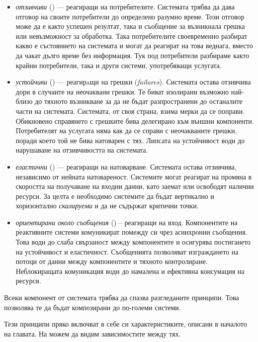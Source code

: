 \begin{itemize}
  \item \emph{отзивчиви} () — реагиращи на потребителите. Системата трябва да дава отговор на своите потребители до определено разумно време. Този отговор може да е както успешен резултат, така и съобщение за възникнала грешка или невъзможност за обработка. Така потребителите своевременно разбират какво е състоянието на системата и могат да реагират на това веднага, вместо да чакат дълго време без информация. Тук под потребители разбираме както крайни потребители, така и други системи, употребяващи услугата.
  
  \item \emph{устойчиви} () — реагирaщи на грешки (\emph{failures}). Системата остава отзивчива дори в случаите на неочаквани грешки. Те биват изолирани възможно най-близо до тяхното възникване за да не бъдат разпространени до останалите части на системата. Системата, от своя страна, взима мерки да се поправи. Обикновено справянето с грешките бива делегирано към външни компоненти. Потребителят на услугата няма как да се справи с неочакваните грешки, поради което той не бива натоварен с тях. Липсата на устойчивост води до нарушаване на отзивчивостта на системата.
  
  \item \emph{еластични} () — реагиращи на натоварване. Системата остава отзивчива, независимо от нейната натовареност. Системите могат реагират на промяна в скоростта на получаване на входни данни, като заемат или освободят налични ресурси. За целта е необходимо системите да бъдат вертикално и хоризонтално \emph{скалируеми} и да не съдържат критични точки.
  
  \item \emph{ориентирани около съобщения} () – реагиращи на вход. Компонентите на реактивните системи комуникират помежду си чрез асинхронни съобщения. Това води до слаба свързаност между компонентите и осигурява постигането на устойчивост и еластичност. Съобщенията позволяват изграждането на потоци от данни между компонентите и тяхното контролиране. Неблокиращата комуникация води до намалена и ефективна консумация на ресурси.
\end{itemize}

Всеки компонент от системата трябва да спазва разгледаните принципи. Това позволява те да бъдат композирани до по-големи системи.

Тези принципи пряко включват в себе си характеристиките, описани в началото на главата. На  можем да видим зависимостите между тях.

